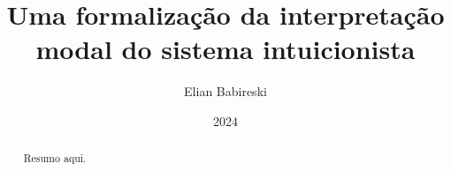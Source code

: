 \documentclass{report}
\begin{document}
    \title{Uma formalização da interpretação modal do sistema intuicionista}
    \author{Elian Babireski}
    \date{2024}

    \maketitle

    \begin{abstract}
        Resumo aqui.
    \end{abstract}

    \tableofcontents

    
    
    
    

    
    
\end{document}
